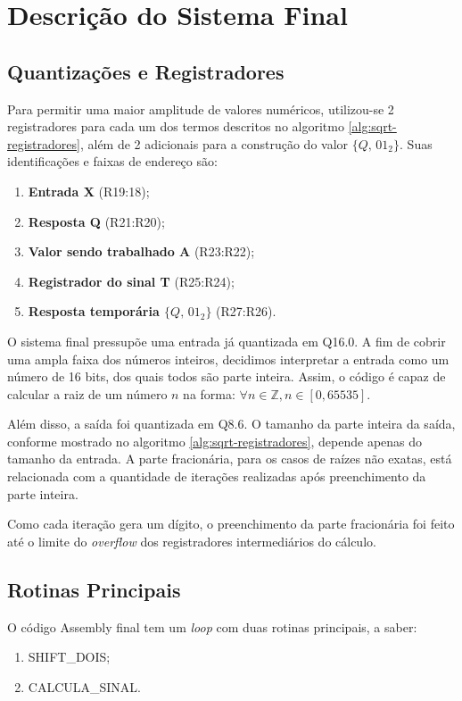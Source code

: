 \documentclass[conference]{IEEEtran}
\begin{document}
\section{Descrição do Sistema Final}
\subsection{Quantizações e Registradores}
Para permitir uma maior amplitude de valores numéricos, utilizou-se 2 registradores para cada um dos termos descritos no algoritmo \ref{alg:sqrt-registradores}, além de 2 adicionais para a construção do valor $\{Q,\,01_2\}$. Suas identificações e faixas de endereço são:
\begin{enumerate}
    \item \textbf{Entrada X}  (R19:18);
    
    \item \textbf{Resposta Q} (R21:R20);
    
    \item \textbf{Valor sendo trabalhado A} (R23:R22);
 
    \item \textbf{Registrador do sinal T} (R25:R24);

    \item \textbf{Resposta temporária $\{Q,\,01_2\}$} (R27:R26).

\end{enumerate}

O sistema final pressupõe uma entrada já quantizada em Q16.0. A fim de cobrir uma ampla faixa dos números inteiros, decidimos interpretar a entrada como um número de 16 bits, dos quais todos são parte inteira. Assim, o código é capaz de calcular a raiz de um número $n$ na forma: $\forall n \in \mathbb{Z}, n \in [0, 65535]$. 

Além disso, a saída foi quantizada em Q8.6. O tamanho da parte inteira da saída, conforme mostrado no algoritmo \ref{alg:sqrt-registradores}, depende apenas do tamanho da entrada. A parte fracionária, para os casos de raízes não exatas, está relacionada com a quantidade de iterações realizadas após preenchimento da parte inteira.

Como cada iteração gera um dígito, o preenchimento da parte fracionária foi feito até o limite do \textit{overflow} dos registradores intermediários do cálculo.

\subsection{Rotinas Principais}
O código Assembly final tem um \textit{loop} com duas rotinas principais, a saber:
\begin{enumerate}
    \item SHIFT\_DOIS;
    \item CALCULA\_SINAL.
\end{enumerate}
\end{document}
